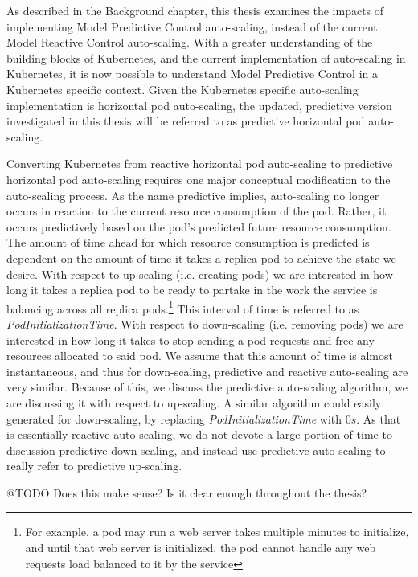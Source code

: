 As described in the Background chapter, this thesis examines the impacts of
implementing Model Predictive Control auto-scaling, instead of the current Model Reactive
Control auto-scaling. With a greater understanding of the building blocks of
Kubernetes, and the current implementation of auto-scaling in Kubernetes, it is
now possible to understand Model Predictive Control in a Kubernetes specific
context. Given the Kubernetes specific auto-scaling implementation is horizontal
pod auto-scaling, the updated, predictive version investigated in this thesis
will be referred to as predictive horizontal pod auto-scaling.

Converting Kubernetes from reactive horizontal pod auto-scaling to predictive
horizontal pod auto-scaling requires one major conceptual modification to the
auto-scaling process. As the name predictive implies, auto-scaling no longer
occurs in reaction to the current resource consumption of the pod. Rather, it occurs
predictively based on the pod's predicted future resource consumption. The
amount of time ahead for which resource consumption is predicted is dependent on
the amount of time it takes a replica pod to achieve the state we desire. With
respect to up-scaling (i.e. creating pods) we are interested in how long it
takes a replica pod to be ready to partake in the work the
service is balancing across all replica pods.\footnote{For example, a pod may
run a web server takes multiple minutes to initialize, and until that web server
is initialized, the pod cannot handle any web requests load balanced to it by
the service} This interval of time is referred to as \textit{PodInitializationTime}.
With respect to down-scaling (i.e. removing pods) we are interested in how long
it takes to stop sending a pod requests and free any resources allocated to said
pod. We assume that this amount of time is almost instantaneous, and thus for
down-scaling, predictive and reactive auto-scaling are very similar. Because of
this, we discuss the predictive auto-scaling algorithm, we are discussing it
with respect to up-scaling. A similar algorithm could easily generated for
down-scaling, by replacing \textit{PodInitializationTime} with $0s$. As that is
essentially reactive auto-scaling, we do not devote a large portion of time to
discussion predictive down-scaling, and instead use predictive auto-scaling to
really refer to predictive up-scaling.

@TODO Does this make sense? Is it clear enough throughout the thesis?

